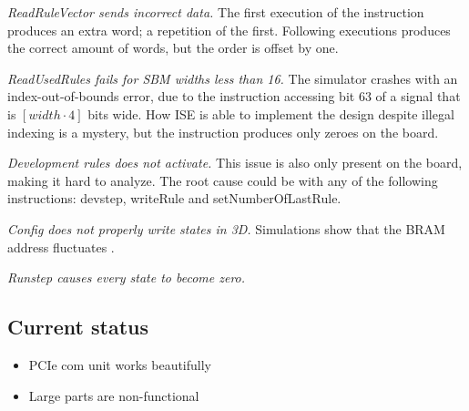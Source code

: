 \emph{ReadRuleVector sends incorrect data.}
The first execution of the instruction produces an extra word; a repetition of the first.
Following executions produces the correct amount of words, but the order is offset by one.

\emph{ReadUsedRules fails for SBM widths less than 16.}
The simulator crashes with an index-out-of-bounds error, due to the instruction accessing bit 63 of a signal that is $[width\cdot4]$ bits wide.
How ISE is able to implement the design despite illegal indexing is a mystery, but the instruction produces only zeroes on the board.

\emph{Development rules does not activate.}
This issue is also only present on the board, making it hard to analyze.
The root cause could be with any of the following instructions: devstep, writeRule and setNumberOfLastRule.

\emph{Config does not properly write states in 3D.}
Simulations show that the BRAM address fluctuates \TODO.

\emph{Runstep causes every state to become zero.}
\TODO

\subsection{Current status}

\TODO

\begin{itemize}
    \item PCIe com unit works beautifully
    \item Large parts are non-functional
\end{itemize}

